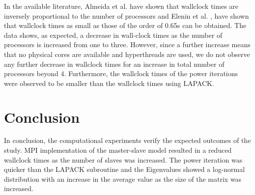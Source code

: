 \documentclass[11pt, oneside]{article}
\begin{document}
 In the available literature, Almeida et al. \cite{Almeida:2013:MEC:2509348.2509354} have shown that wallclock times are inversely proportional to the number of processors and Elenin et al. \cite{Elenin2013EvaluationOM}, have shown that wallclock times as small as those of the order of 0.65s can be obtained. The data shows, as expected, a decrease in wall-clock times as the number of processors is increased from one to three. However, since a further increase means that no physical cores are available and hyperthreads are used, we do not observe any further decrease in wallclock times for an increase in total number of processors beyond 4. Furthermore, the wallclock times of the  power iterations were observed to be smaller than the wallclock times using LAPACK.


\section{Conclusion}
In conclusion, the computational experiments verify the expected outcomes of the study. MPI implementation of the master-slave model resulted in a reduced wallclock times as the number of slaves was increased. The power iteration was quicker than the LAPACK subroutine and the Eigenvalues showed a log-normal distribution with an increase in the average value as the size of the matrix was increased.      

\newpage



\end{document}
